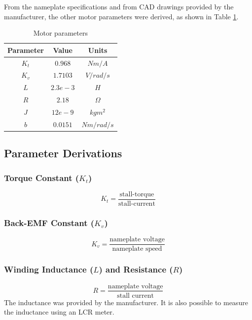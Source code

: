 \documentclass{report}
\begin{document}
From the nameplate specifications and from CAD drawings provided by the manufacturer, the other motor parameters were derived, as shown in Table \ref{table:pololu_motor_params}.


\begin{table}
\begin{center}
\begin{tabular}{|c|c|c|}
\hline
\textbf{Parameter} & \textbf{Value} & \textbf{Units} \\
\hline \hline
$K_t$ & $0.968$ & $Nm/A$ \\
\hline
$K_v$ & $1.7103$ & $V/rad/s$ \\
\hline
$L$ & $2.3e-3$ & $H$ \\
\hline
$R$ & $2.18$ & $\Omega$ \\
\hline
$J$ & $12e-9$ & $kgm^2$ \\
\hline
$b$ & $0.0151$ & $Nm/rad/s$ \\
\hline
\end{tabular}
\caption{Motor parameters} \label{table:pololu_motor_params}
\end{center}
\end{table}

\subsection{Parameter Derivations}

\subsubsection{Torque Constant ($K_t$)}
\begin{equation}
K_t = \frac{\text{stall-torque}}{\text{stall-current}}
\end{equation}

\subsubsection{Back-EMF Constant ($K_v$)}
\begin{equation}
K_v = \frac{\text{nameplate voltage}}{\text{nameplate speed}}
\end{equation}

\subsubsection{Winding Inductance ($L$) and Resistance ($R$)}
\begin{equation}
R = \frac{\text{nameplate voltage}}{\text{stall current}}
\end{equation}
The inductance was provided by the manufacturer. It is also possible to measure the inductance using an LCR meter.
\end{document}
